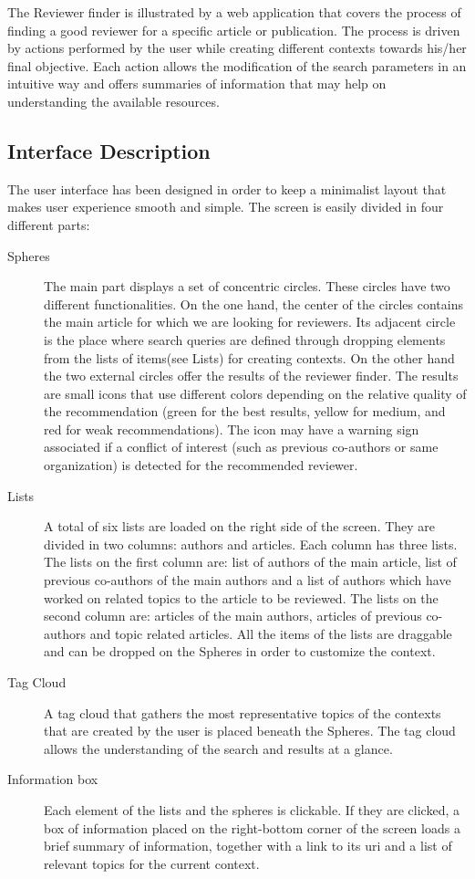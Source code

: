 The Reviewer finder is illustrated by a web application that covers the process of finding a good reviewer for a specific article or publication. The process is driven by actions performed by the user while creating different contexts towards his/her final objective. Each action allows the modification of the search parameters in an intuitive way and offers summaries of information that may help on understanding the available resources.\\
\subsection{Interface Description}
The user interface has been designed in order to keep a minimalist layout that makes user experience smooth and simple. The screen is easily divided in four different parts:
\begin{description}
\item[Spheres]The main part displays a set of concentric circles. These circles have two different functionalities. On the one hand, the center of the circles contains the main article for which we are looking for reviewers. Its adjacent circle is the place where search queries are defined through dropping elements from the lists of items(see Lists) for creating contexts. On the other hand the two external circles offer the results of the reviewer finder. The results are small icons that use different colors depending on the relative quality of the recommendation (green for the best results, yellow for medium, and red for weak recommendations). The icon may have a warning sign associated if a conflict of interest (such as previous co-authors or same organization) is detected for the recommended reviewer.
\item[Lists]A total of six lists are loaded on the right side of the screen. They are divided in two columns: authors and articles. Each column has three lists. The lists on the first column are: list of authors of the main article, list of previous co-authors of the main authors and a list of authors which have worked on related topics to the article to be reviewed. The lists on the second column are: articles of the main authors, articles of previous co-authors and topic related articles. All the items of the lists are draggable and can be dropped on the Spheres in order to customize the context.
\item[Tag Cloud]A tag cloud that gathers the most representative topics of the contexts that are created by the user is placed beneath the Spheres. The tag cloud allows the understanding of the search and results at a glance.
\item[Information box]Each element of the lists and the spheres is clickable. If they are clicked, a box of information placed on the right-bottom corner of the screen loads a brief summary of information, together with a link to its uri and a list of relevant topics for the current context.
\end{description}
